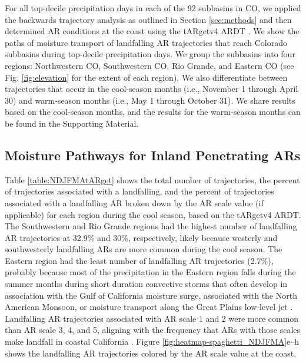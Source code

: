 \documentclass[draft]{agujournal2019}
\begin{document}
For all top-decile precipitation days in each of the 92 subbasins in CO, we applied the backwards trajectory analysis as outlined in Section \ref{sec:methods} and then determined AR conditions at the coast using the tARgetv4 ARDT \cite{Guan2024AERA5}. We show the paths of moisture transport of landfalling AR trajectories that reach Colorado subbasins during top-decile precipitation days. We group the subbasins into four regions: Northwestern CO, Southwestern CO, Rio Grande, and Eastern CO (see Fig. \ref{fig:elevation} for the extent of each region). We also differentiate between trajectories that occur in the cool-season months (i.e., November 1 through April 30) and warm-season months (i.e., May 1 through October 31). We share results based on the cool-season months, and the results for the warm-season months can be found in the Supporting Material. 

\subsection{Moisture Pathways for Inland Penetrating ARs}
\label{sec:results:moisture_pathways}

Table \ref{table:NDJFMAtARget} shows the total number of trajectories, the percent of trajectories associated with a landfalling, and the percent of trajectories associated with a landfalling AR broken down by the AR scale value (if applicable) for each region during the cool season, based on the tARgetv4 ARDT. The Southwestern and Rio Grande regions had the highest number of landfalling AR trajectories at 32.9\% and 30\%, respectively, likely because westerly and southwesterly landfalling ARs are more common during the cool season. The Eastern region had the least number of landfalling AR trajectories (2.7\%), probably because most of the precipitation in the Eastern region falls during the summer months during short duration convective storms that often develop in association with the Gulf of California moisture surge, associated with the North American Monsoon, or moisture transport along the Great Plains low-level jet \cite{Helfand1995ClimatologyStates, Higgins2004RelationshipsStates, Pu2016DynamicalPrecipitation,  Schubert1998SubseasonalStates, Weaver2008VariabilityImpacts}. Landfalling AR trajectories associated with AR scale 1 and 2 were more common than AR scale 3, 4, and 5, aligning with the frequency that ARs with those scales make landfall in coastal California \cite[Fig. 7]{MartinRalph2019}. Figure \ref{fig:heatmap-spaghetti_NDJFMA}e--h shows the landfalling AR trajectories colored by the AR scale value at the coast.
\end{document}
